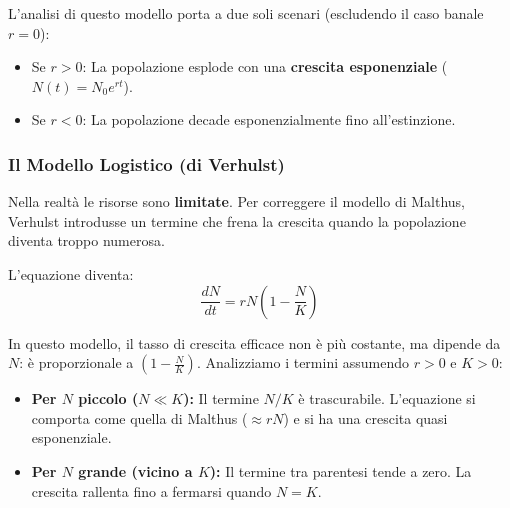 \documentclass[openany]{book}
\theoremstyle{definition}
\theoremstyle{remark}
\begin{document}
L'analisi di questo modello porta a due soli scenari (escludendo il caso banale $r=0$):
\begin{itemize}
    \item Se $r > 0$: La popolazione esplode con una \textbf{crescita esponenziale} ($N(t) = N_0 e^{rt}$).
    \item Se $r < 0$: La popolazione decade esponenzialmente fino all'estinzione.
\end{itemize}

\subsubsection*{Il Modello Logistico (di Verhulst)}
Nella realtà le risorse  sono \textbf{limitate}. Per correggere il modello di Malthus, Verhulst introdusse un termine che frena la crescita quando la popolazione diventa troppo numerosa.

L'equazione diventa:
\begin{equation}
    \frac{dN}{dt} = rN \left( 1 - \frac{N}{K} \right)
\end{equation}

In questo modello, il tasso di crescita efficace non è più costante, ma dipende da $N$: è proporzionale a $\left(1 - \frac{N}{K}\right)$.
Analizziamo i termini assumendo $r>0$ e $K>0$:
\begin{itemize}
    \item \textbf{Per $N$ piccolo ($N \ll K$):} Il termine $N/K$ è trascurabile. L'equazione si comporta come quella di Malthus ($\approx rN$) e si ha una crescita quasi esponenziale.
    \item \textbf{Per $N$ grande (vicino a $K$):} Il termine tra parentesi tende a zero. La crescita rallenta fino a fermarsi quando $N=K$.
\end{itemize}
\end{document}
